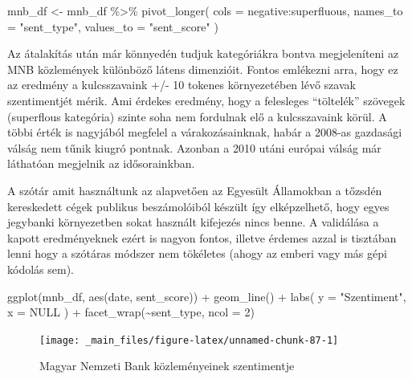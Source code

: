 \documentclass[
]{book}
\newenvironment{Shaded}{\begin{snugshade}}{\end{snugshade}}
\newcommand{\AttributeTok}[1]{\textcolor[rgb]{0.77,0.63,0.00}{#1}}
\newcommand{\ConstantTok}[1]{\textcolor[rgb]{0.00,0.00,0.00}{#1}}
\newcommand{\DecValTok}[1]{\textcolor[rgb]{0.00,0.00,0.81}{#1}}
\newcommand{\FunctionTok}[1]{\textcolor[rgb]{0.00,0.00,0.00}{#1}}
\newcommand{\NormalTok}[1]{#1}
\newcommand{\OtherTok}[1]{\textcolor[rgb]{0.56,0.35,0.01}{#1}}
\newcommand{\SpecialCharTok}[1]{\textcolor[rgb]{0.00,0.00,0.00}{#1}}
\newcommand{\StringTok}[1]{\textcolor[rgb]{0.31,0.60,0.02}{#1}}
\begin{document}
\begin{Shaded}
\begin{Highlighting}[]
\NormalTok{mnb\_df }\OtherTok{\textless{}{-}}\NormalTok{ mnb\_df }\SpecialCharTok{\%\textgreater{}\%}
  \FunctionTok{pivot\_longer}\NormalTok{(}
    \AttributeTok{cols =}\NormalTok{ negative}\SpecialCharTok{:}\NormalTok{superfluous,}
    \AttributeTok{names\_to =} \StringTok{"sent\_type"}\NormalTok{,}
    \AttributeTok{values\_to =} \StringTok{"sent\_score"}
\NormalTok{  )}
\end{Highlighting}
\end{Shaded}

Az átalakítás után már könnyedén tudjuk kategóriákra bontva
megjeleníteni az MNB közlemények különböző látens dimenzióit. Fontos
emlékezni arra, hogy ez az eredmény a kulcsszavaink +/- 10 tokenes
környezetében lévő szavak szentimentjét mérik. Ami érdekes eredmény,
hogy a felesleges ``töltelék'' szövegek (superflous kategória) szinte
soha nem fordulnak elő a kulcsszavaink körül. A többi érték is nagyjából
megfelel a várakozásainknak, habár a 2008-as gazdasági válság nem tűnik
kiugró pontnak. Azonban a 2010 utáni európai válság már láthatóan
megjelnik az idősorainkban.

A szótár amit használtunk az alapvetően az Egyesült Államokban a tőzsdén
kereskedett cégek publikus beszámolóiból készült így elképzelhető, hogy
egyes jegybanki környezetben sokat használt kifejezés nincs benne. A
validálása a kapott eredményeknek ezért is nagyon fontos, illetve
érdemes azzal is tisztában lenni hogy a szótáras módszer nem tökéletes
(ahogy az emberi vagy más gépi kódolás sem).

\begin{Shaded}
\begin{Highlighting}[]
\FunctionTok{ggplot}\NormalTok{(mnb\_df, }\FunctionTok{aes}\NormalTok{(date, sent\_score)) }\SpecialCharTok{+}
  \FunctionTok{geom\_line}\NormalTok{() }\SpecialCharTok{+}
  \FunctionTok{labs}\NormalTok{(}
    \AttributeTok{y =} \StringTok{"Szentiment"}\NormalTok{,}
    \AttributeTok{x =} \ConstantTok{NULL}
\NormalTok{  ) }\SpecialCharTok{+}
  \FunctionTok{facet\_wrap}\NormalTok{(}\SpecialCharTok{\textasciitilde{}}\NormalTok{sent\_type, }\AttributeTok{ncol =} \DecValTok{2}\NormalTok{)}
\end{Highlighting}
\end{Shaded}

\begin{figure}

{\centering \texttt{[image: \_main\_files/figure-latex/unnamed-chunk-87-1]} 

}

\caption{Magyar Nemzeti Bank közleményeinek szentimentje}\label{fig:unnamed-chunk-87}
\end{figure}
\end{document}
